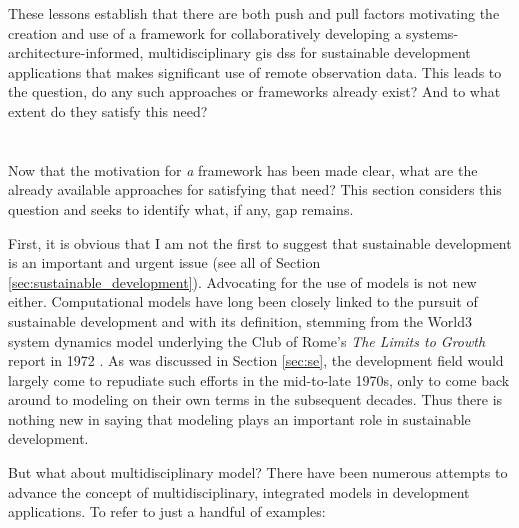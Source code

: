 \begin{itemize}[itemsep=0pt,parsep=0pt]
\end{itemize}

These lessons establish that there are both push and pull factors motivating the creation and use of a framework for collaboratively developing a systems-architecture-informed, multidisciplinary \ac{gis} \ac{dss} for sustainable development applications that makes significant use of remote observation data. This leads to the question, do any such approaches or frameworks already exist? And to what extent do they satisfy this need?

\section{} \label{sec:gap}

Now that the motivation for \textit{a} framework has been made clear, what are the already available approaches for satisfying that need? This section considers this question and seeks to identify what, if any, gap remains.

First, it is obvious that I am not the first to suggest that sustainable development is an important and urgent issue (see all of Section \ref{sec:sustainable_development}). Advocating for the use of models is not new either. Computational models have long been closely linked to the pursuit of sustainable development and with its definition, stemming from the World3 system dynamics model underlying the Club of Rome's \textit{The Limits to Growth} report in 1972 \cite{meadowsLimitsGrowth1972}. As was discussed in Section \ref{sec:se}, the development field would largely come to repudiate such efforts in the mid-to-late 1970s, only to come back around to modeling on their own terms in the subsequent decades. Thus there is nothing new in saying that modeling plays an important role in sustainable development.

But what about multidisciplinary model? There have been numerous attempts to advance the concept of multidisciplinary, integrated models in development applications. To refer to just a handful of examples:

